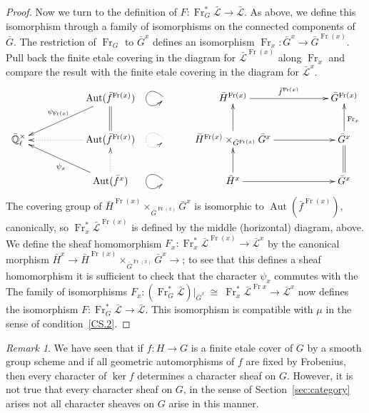 \documentclass[11pt]{amsart}
\theoremstyle{plain}
\theoremstyle{definition}
\theoremstyle{remark}
\newtheorem{remark}[theorem]{Remark}
\newcommand{\EE}{\mathbb{\bar Q}_\ell}
\newcommand{\Frob}{{\operatorname{Fr}}}
\DeclareMathOperator{\Aut}{Aut}
\newcommand{\iso}{{\ \cong\ }}
\newcommand{\gcs}[1]{{\mathcal{\bar #1}}}
\newcommand\Clifton[1]{\marginpar{\smaller\smaller CC: #1}}
\begin{document}
\begin{proof}
Now we turn to the definition of $F : \Frob_{G}^* \gcs{L} \to \gcs{L}$. As above, we define this isomorphism through a family of isomorphisms on the connected components of ${\bar G}$. The restriction of $\Frob_{G}$ to ${\bar G}^x$ defines an isomorphism $\Frob_x : {\bar G}^x \to {\bar G}^{\Frob(x)}$. 
Pull back the finite etale covering in the diagram for $\gcs{L}^{\Frob(x)}$ along $\Frob_x$ and compare the result with the finite etale covering in the diagram for $\gcs{L}^{x}$.
\[
\xymatrix{ 
  && \ar[dll]_{\psi_{\Frob(x)}} \Aut({\bar f}^{\Frob(x)}) & \ar@(ul,dl) & {\bar H}^{\Frob(x)} \ar[rr]^{{\bar f}^{\Frob(x)}} && {\bar G}^{\Frob(x)}\\ 
\EE^\times & & \ar@{.>}[ll] \Aut({\bar f}^{\Frob(x)})  \ar@{=}[u] & \ar@{.>}@(ul,dl)  & \ar[u] {\bar H}^{\Frob(x)} \times_{{\bar G}^{\Frob(x)}} {\bar G}^x \ar[rr] && \ar[u]_{\Frob_{x}} {\bar G}^x\\
& &  \ar[ull]^{\psi_x}  \ar@{.>}[u] \Aut({\bar f}^{x}) & \ar@(ul,dl) & \ar[u] {\bar H}^x \ar[rr] && \ar@{=} [u] {\bar G}^x\\
}
\] 
The covering group of ${\bar H}^{\Frob(x)} \times_{{\bar G}^{\Frob(x)}} {\bar G}^x$ is isomorphic to $\Aut({\bar f}^{\Frob(x)})$, canonically, so $\Frob_x^* \gcs{L}^{\Frob(x)}$ is defined by the middle (horizontal) diagram, above.  We define the sheaf homomorphism $F_x : \Frob_x^* \gcs{L}^{\Frob(x)} \to \gcs{L}^x$ by the canonical morphism ${\bar H}^x \to  {\bar H}^{\Frob(x)} \times_{{\bar G}^{\Frob(x)}} {\bar G}^x \to $; to see that this defines a sheaf homomorphism it is sufficient to check that the character $\psi_x$ commutes with the  
The family of isomorphisms  $F_x : (\Frob_{G}^* \gcs{L})\vert_{{\bar G}^x} \iso \Frob_x^* \gcs{L}^{\Frob{x}} \to \gcs{L}^x$ now defines the isomorphism $F : \Frob_{G}^* \gcs{L} \to \gcs{L}$. 
\Clifton{Add some detail here.}
This isomorphism is compatible with $\mu$ in the sense of condition~\ref{CS.2}. 
\end{proof}

\begin{remark}
We have seen that if $f : H\to G$ is a finite etale cover of $G$ by a smooth group scheme and if all geometric automorphisms of $f$ are fixed by Frobenius, then every character of $\ker f$ determines a character sheaf on $G$. However, it is not true that every character sheaf on $G$, in the sense of Section~\ref{sec:category} arises not all character sheaves on $G$ arise in this manner. 
\end{remark}
%
\end{document}
